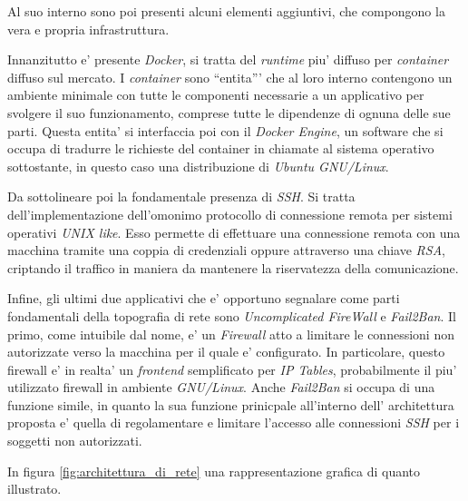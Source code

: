 \documentclass[a4paper]{report}
\newcommand{\quotes}[1]{``#1''}
\begin{document}
		Al suo interno sono poi presenti alcuni elementi aggiuntivi, che compongono la vera e propria infrastruttura.

		Innanzitutto e' presente \emph{Docker}, si tratta del \emph{runtime} piu' diffuso per \emph{container} diffuso
		sul mercato. I \emph{container} sono \quotes{entita'} che al loro interno contengono un ambiente minimale con
		tutte le componenti necessarie a un applicativo per svolgere il suo funzionamento, comprese tutte le dipendenze
		di ognuna delle sue parti. Questa entita' si interfaccia poi con il \emph{Docker Engine}, un software che si
		occupa di tradurre le richieste del container in chiamate al sistema operativo sottostante, in questo caso una
		distribuzione di \emph{Ubuntu GNU/Linux}.

		Da sottolineare poi la fondamentale presenza di \emph{SSH}\label{SSH}. Si tratta dell'implementazione
		dell'omonimo protocollo di connessione remota per sistemi operativi \emph{UNIX like}. Esso permette di
		effettuare una connessione remota con una macchina tramite una coppia di credenziali oppure attraverso una chiave
		\emph{RSA}, criptando il traffico in maniera da mantenere la riservatezza della comunicazione.

		Infine, gli ultimi due applicativi che e' opportuno segnalare come parti fondamentali della topografia di rete
		sono \emph{Uncomplicated FireWall} e \emph{Fail2Ban}. Il primo, come intuibile dal nome, e' un \emph{Firewall}
		atto a limitare le connessioni non autorizzate verso la macchina per il quale e' configurato. In particolare,
		questo firewall e' in realta' un \emph{frontend} semplificato per \emph{IP Tables}, probabilmente il piu'
		utilizzato firewall in ambiente \emph{GNU/Linux}.
		Anche \emph{Fail2Ban} si occupa di una funzione simile, in quanto la sua funzione prinicpale all'interno dell'
		architettura proposta e' quella di regolamentare e limitare l'accesso alle connessioni \emph{SSH} per i soggetti
		non autorizzati.

		In figura \ref{fig:architettura_di_rete} una rappresentazione grafica di quanto illustrato.
\end{document}
